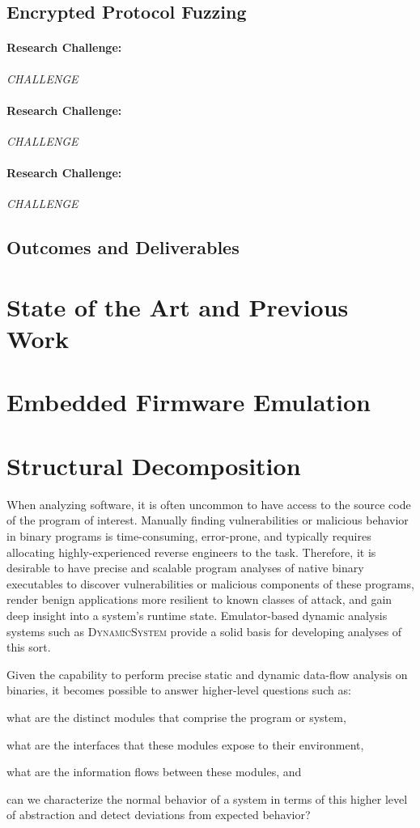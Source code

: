 \documentclass[letterpaper,twoside,11pt,headings=small]{scrartcl}
\newcommand{\dynamicsys}{\textsc{DynamicSystem}\xspace}
\newcommand{\challenge}[1]{\paragraph{Research Challenge:} \emph{#1}}
\begin{document}
\subsection{Encrypted Protocol Fuzzing}
\label{sec:overview:fuzzing}

\challenge{CHALLENGE}

\challenge{CHALLENGE}

\challenge{CHALLENGE}

\subsection{Outcomes and Deliverables}
\label{sec:overview:outcomes}

\section{State of the Art and Previous Work}
\label{sec:related}

\section{Embedded Firmware Emulation}
\label{sec:research:firmware}



\section{Structural Decomposition}
\label{sec:research:structure}

When analyzing software, it is often uncommon to have access to the source
code of the program of interest.  Manually finding vulnerabilities or
malicious behavior in binary programs is time-consuming, error-prone, and
typically requires allocating highly-experienced reverse engineers to the
task. Therefore, it is desirable to have precise and scalable program analyses
of native binary executables to discover vulnerabilities or malicious
components of these programs, render benign applications more resilient to
known classes of attack, and gain deep insight into a system's runtime state.
Emulator-based dynamic analysis systems such as \dynamicsys provide a solid
basis for developing analyses of this sort.

Given the capability to perform precise static and dynamic data-flow analysis
on binaries, it becomes possible to answer higher-level questions such as:%
\begin{inparaenum}
    \item what are the distinct modules that comprise the program or system,
    \item what are the interfaces that these modules expose to their environment,
    \item what are the information flows between these modules, and
    \item can we characterize the normal behavior of a system in terms of this higher
        level of abstraction and detect deviations from expected behavior?
\end{inparaenum}
\end{document}
